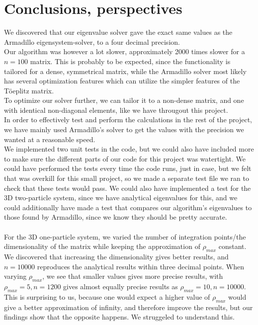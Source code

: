 \documentclass{article}
\begin{document}
\section{Conclusions, perspectives}
	We discovered that our eigenvalue solver gave the exact same values as
	the Armadillo eigensystem-solver, to a four decimal precision.\\
	Our algorithm was however a lot slower, approximately 2000 times slower for a $n=100$ matrix.
	This is probably to be expected, since the functionality is tailored for a dense,
	symmetrical matrix, while the Armadillo solver most likely has
	several optimization features which can utilize the simpler features of the Töeplitz matrix.\\
	To optimize our solver further, we can tailor it to a non-dense matrix, and one with identical non-diagonal elements, like we have througout this project.\\
	In order to effectively test and perform the calculations in the rest of the project, we have mainly used Armadillo's solver to get the values with the precision we wanted at a reasonable speed.\\

	We implemented two unit tests in the code, but we could also have included more to make sure the different parts of our code for this project was watertight. We could have performed the tests every time the code runs, just in case, but we felt that was overkill for this small project, so we made a separate test file we ran to check that these tests would pass. We could also have implemented a test for the 3D two-particle system, since we have analytical eigenvalues for this, and we could additionally have made a test that compares our algorithm's eigenvalues to those found by Armadillo, since we know they should be pretty accurate.\\\\

	For the 3D one-particle system, we varied the number of integration points/the dimensionality of the matrix while keeping the approximation of $\rho_{max}$ constant. We discovered that increasing the dimensionality gives better results, and $n=10000$ reproduces the analytical results within three decimal points. When varying $\rho_{max}$, we see that smaller values gives more precise results, with $\rho_{max} = 5, n=1200$ gives almost equally precise results as $\rho_{max} = 10, n=10000$. This is surprising to us, because one would expect a higher value of $\rho_{max}$ would give a better approximation of infinity, and therefore improve the results, but our findings show that the opposite happens. We struggeled to understand this.\\\\
\end{document}

